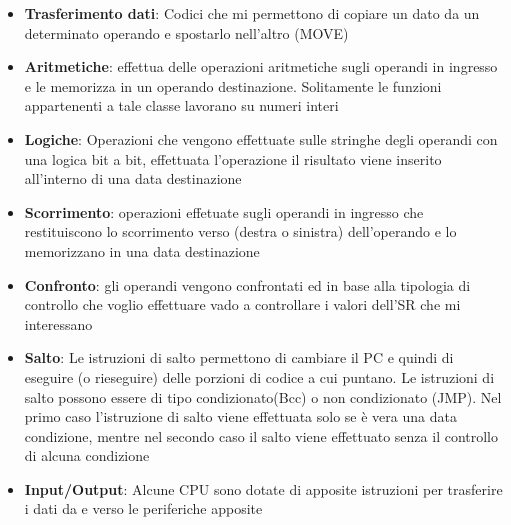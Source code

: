 \begin{itemize}
    \item \textbf{Trasferimento dati}: Codici che mi permettono di copiare un dato da un determinato operando e spostarlo nell'altro (MOVE)

    \item \textbf{Aritmetiche}: effettua delle operazioni aritmetiche sugli operandi in ingresso e le memorizza in un operando destinazione. Solitamente le funzioni appartenenti a tale classe lavorano su numeri interi

    \item \textbf{Logiche}: Operazioni che vengono effettuate sulle stringhe degli operandi con una logica bit a bit, effettuata l'operazione il risultato viene inserito all'interno di una data destinazione

    \item \textbf{Scorrimento}: operazioni effetuate sugli operandi in ingresso che restituiscono lo scorrimento verso (destra o sinistra) dell'operando e lo memorizzano in una data destinazione

    \item \textbf{Confronto}: gli operandi vengono confrontati ed in base alla tipologia di controllo che voglio effettuare vado a controllare i valori dell'SR che mi interessano

    \item \textbf{Salto}: Le istruzioni di salto permettono di cambiare il PC e quindi di eseguire (o rieseguire) delle porzioni di codice a cui puntano. Le istruzioni di salto possono essere di tipo condizionato(Bcc) o non condizionato (JMP). Nel primo caso l'istruzione di salto viene effettuata solo se è vera una data condizione, mentre nel secondo caso il salto viene effettuato senza il controllo di alcuna condizione

    \item \textbf{Input/Output}: Alcune CPU sono dotate di apposite istruzioni per trasferire i dati da e verso le periferiche apposite
\end{itemize}
